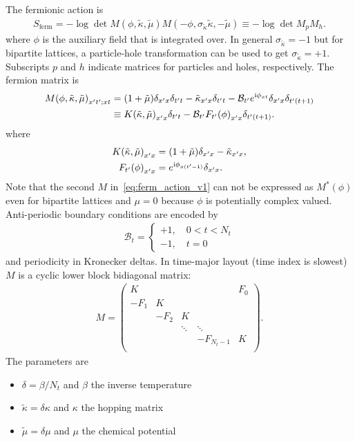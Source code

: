 \documentclass[a4paper, fleqn, twoside, notitlepage]{scrartcl}
\begin{document}
The fermionic action is
\begin{align}
  S_\text{ferm} = - \log \det M(\phi, \tilde{\kappa}, \tilde{\mu}) M(-\phi, \sigma_{\tilde{\kappa}}\tilde{\kappa}, -\tilde{\mu}) \equiv - \log \det M_p M_h.\label{eq:ferm_action_v1}
\end{align}
where $\phi$ is the auxiliary field that is integrated over. In general $\sigma_{\tilde{\kappa}} = -1$ but for bipartite lattices, a particle-hole transformation can be used to get $\sigma_{\tilde{\kappa}} = +1$. Subscripts $p$ and $h$ indicate matrices for particles and holes, respectively. The fermion matrix is
\begin{align}
  {M(\phi, \tilde{\kappa}, \tilde{\mu})}_{x't';xt}
  &= (1+\tilde{\mu})\delta_{x'x}\delta_{t't} - \tilde{\kappa}_{x'x}\delta_{t't} - \mathcal{B}_{t'} e^{\mathrm{i}\phi_{xt}}\delta_{x'x}\delta_{t'(t+1)}\\
  &\equiv {K(\tilde{\kappa}, \tilde{\mu})}_{x'x}\delta_{t't} - \mathcal{B}_{t'}{F_{t'}(\phi)}_{x'x}\delta_{t'(t+1)}.
\end{align}
where
\begin{align}
  {K(\tilde{\kappa}, \tilde{\mu})}_{x'x} &= (1+\tilde{\mu})\delta_{x'x} - \tilde{\kappa}_{x'x},\\
  {F_{t'}(\phi)}_{x'x} &= e^{\mathrm{i}\phi_{x(t'-1)}}\delta_{x'x}.
\end{align}
Note that the second $M$ in~\eqref{eq:ferm_action_v1} can not be expressed as $M^*(\phi)$ even for bipartite lattices and $\mu=0$ because $\phi$ is potentially complex valued.
Anti-periodic boundary conditions are encoded by
\begin{align}
  \mathcal{B}_t =
  \begin{cases}
    +1,\quad 0 < t < N_t\\
    -1,\quad t = 0
  \end{cases}
\end{align}
and periodicity in Kronecker deltas.
In time-major layout (time index is slowest) $M$ is a cyclic lower block bidiagonal matrix:
\begin{align}
  M =
  \begin{pmatrix}
    K    &      &        &        & F_0 \\
    -F_1 & K    &        &        &     \\
         & -F_2 & K      &        &     \\
         &      & \ddots & \ddots &     \\
         &      &        &-F_{N_t-1}&K   \\
  \end{pmatrix}.\label{eq:ferm_mat_block_v1}
\end{align}
The parameters are
\begin{itemize}
\item $\delta = \beta / N_t$ and $\beta$ the inverse temperature
\item $\tilde{\kappa} = \delta\kappa$ and $\kappa$ the hopping matrix
\item $\tilde{\mu} = \delta\mu$ and $\mu$ the chemical potential
\end{itemize}
\end{document}
